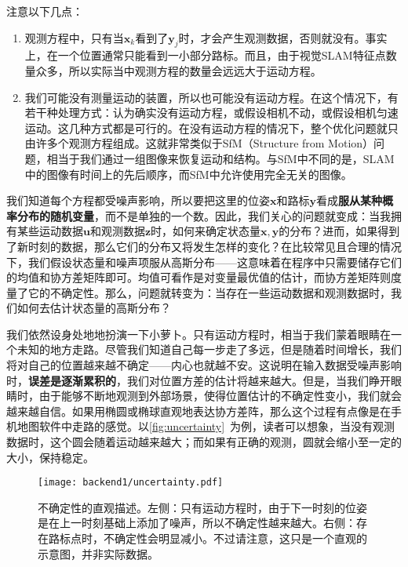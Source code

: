 注意以下几点：

\begin{enumerate}
	\item 观测方程中，只有当$\bm{x}_k$看到了$\bm{y}_j$时，才会产生观测数据，否则就没有。事实上，在一个位置通常只能看到一小部分路标。而且，由于视觉SLAM特征点数量众多，所以实际当中观测方程的数量会远远大于运动方程。
	\item 我们可能没有测量运动的装置，所以也可能没有运动方程。在这个情况下，有若干种处理方式：认为确实没有运动方程，或假设相机不动，或假设相机匀速运动。这几种方式都是可行的。在没有运动方程的情况下，整个优化问题就只由许多个观测方程组成。这就非常类似于SfM（Structure from Motion）问题，相当于我们通过一组图像来恢复运动和结构。与SfM中不同的是，SLAM中的图像有时间上的先后顺序，而SfM中允许使用完全无关的图像。
\end{enumerate}

我们知道每个方程都受噪声影响，所以要把这里的位姿$\bm{x}$和路标$\bm{y}$看成\textbf{服从某种概率分布的随机变量}，而不是单独的一个数。因此，我们关心的问题就变成：当我拥有某些运动数据$\bm{u}$和观测数据$\bm{z}$时，如何来确定状态量$\bm{x}, \bm{y}$的分布？进而，如果得到了新时刻的数据，那么它们的分布又将发生怎样的变化？在比较常见且合理的情况下，我们假设状态量和噪声项服从高斯分布——这意味着在程序中只需要储存它们的均值和协方差矩阵即可。均值可看作是对变量最优值的估计，而协方差矩阵则度量了它的不确定性。那么，问题就转变为：当存在一些运动数据和观测数据时，我们如何去估计状态量的高斯分布？

我们依然设身处地地扮演一下小萝卜。只有运动方程时，相当于我们蒙着眼睛在一个未知的地方走路。尽管我们知道自己每一步走了多远，但是随着时间增长，我们将对自己的位置越来越不确定——内心也就越不安。这说明在输入数据受噪声影响时，\textbf{误差是逐渐累积的}，我们对位置方差的估计将越来越大。但是，当我们睁开眼睛时，由于能够不断地观测到外部场景，使得位置估计的不确定性变小，我们就会越来越自信。如果用椭圆或椭球直观地表达协方差阵，那么这个过程有点像是在手机地图软件中走路的感觉。以\autoref{fig:uncertainty}~为例，读者可以想象，当没有观测数据时，这个圆会随着运动越来越大；而如果有正确的观测，圆就会缩小至一定的大小，保持稳定。

\begin{figure}[!ht]
	\centering
	\texttt{[image: backend1/uncertainty.pdf]}
	\caption{不确定性的直观描述。左侧：只有运动方程时，由于下一时刻的位姿是在上一时刻基础上添加了噪声，所以不确定性越来越大。右侧：存在路标点时，不确定性会明显减小。不过请注意，这只是一个直观的示意图，并非实际数据。}
	\label{fig:uncertainty}
\end{figure}

